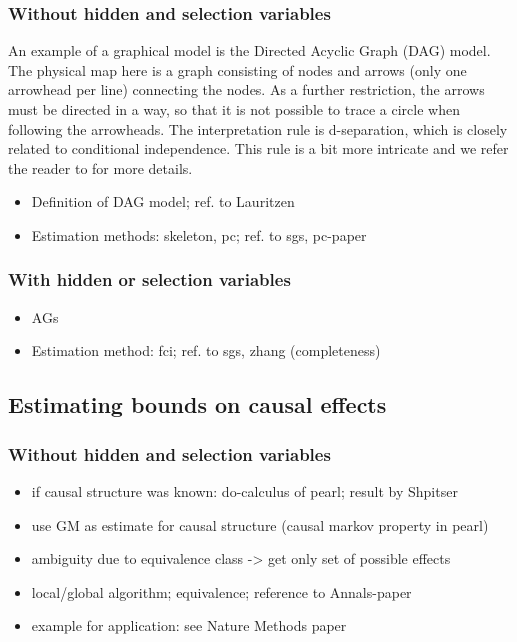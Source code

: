 \documentclass[article]{jss}
\begin{document}
\subsubsection{Without hidden and selection variables}
An example of a graphical model is the Directed Acyclic Graph (DAG)
model. The physical map here is a graph consisting of nodes and arrows
(only one arrowhead per line) connecting the nodes. As a further
restriction, the arrows must be directed in a way, so that it is not
possible to trace a circle when following the arrowheads. The
interpretation rule is d-separation, which is closely related to
conditional independence. This rule is a bit more intricate and we refer
the reader to \cite{lauritzen} for more details.

\begin{itemize}
\item Definition of DAG model; ref. to Lauritzen
\item Estimation methods: skeleton, pc; ref. to sgs, pc-paper
\end{itemize}
\subsubsection{With hidden or selection variables}
\begin{itemize}
\item AGs
\item Estimation method: fci; ref. to sgs, zhang (completeness)
\end{itemize}

\subsection{Estimating bounds on causal effects}
\subsubsection{Without hidden and selection variables}
\begin{itemize}
\item if causal structure was known: do-calculus of pearl; result by Shpitser
\item use GM as estimate for causal structure (causal markov property in pearl)
\item ambiguity due to equivalence class -> get only set of possible effects
\item local/global algorithm; equivalence; reference to Annals-paper
  \item example for application: see Nature Methods paper
\end{itemize}
\end{document}
